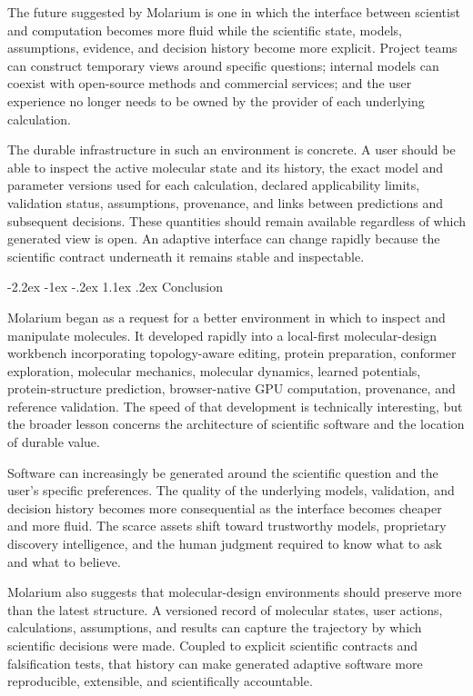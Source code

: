 \documentclass[11pt]{article}
\makeatletter
\renewcommand\section{\@startsection{section}{1}{\z@}%
  {-2.2ex \@plus -1ex \@minus -.2ex}%
  {1.1ex \@plus .2ex}%
  {\normalfont\Large\bfseries\color{molblue}}}
\makeatother
\begin{document}
The future suggested by Molarium is one in which the interface between scientist and computation becomes more fluid while the scientific state, models, assumptions, evidence, and decision history become more explicit. Project teams can construct temporary views around specific questions; internal models can coexist with open-source methods and commercial services; and the user experience no longer needs to be owned by the provider of each underlying calculation.

The durable infrastructure in such an environment is concrete. A user should be able to inspect the active molecular state and its history, the exact model and parameter versions used for each calculation, declared applicability limits, validation status, assumptions, provenance, and links between predictions and subsequent decisions. These quantities should remain available regardless of which generated view is open. An adaptive interface can change rapidly because the scientific contract underneath it remains stable and inspectable.

\section{Conclusion}

Molarium began as a request for a better environment in which to inspect and manipulate molecules. It developed rapidly into a local-first molecular-design workbench incorporating topology-aware editing, protein preparation, conformer exploration, molecular mechanics, molecular dynamics, learned potentials, protein-structure prediction, browser-native GPU computation, provenance, and reference validation. The speed of that development is technically interesting, but the broader lesson concerns the architecture of scientific software and the location of durable value.

Software can increasingly be generated around the scientific question and the user's specific preferences. The quality of the underlying models, validation, and decision history becomes more consequential as the interface becomes cheaper and more fluid. The scarce assets shift toward trustworthy models, proprietary discovery intelligence, and the human judgment required to know what to ask and what to believe.

Molarium also suggests that molecular-design environments should preserve more than the latest structure. A versioned record of molecular states, user actions, calculations, assumptions, and results can capture the trajectory by which scientific decisions were made. Coupled to explicit scientific contracts and falsification tests, that history can make generated adaptive software more reproducible, extensible, and scientifically accountable.
\end{document}
